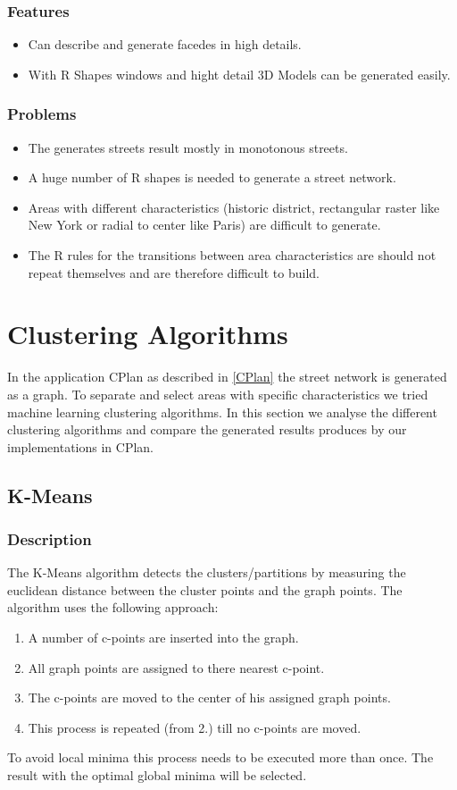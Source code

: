 \documentclass[11pt, a4paper]{report}
\begin{document}
\subsubsection{Features}
\begin{itemize}
    \item Can describe and generate facedes in high details.
    \item With R Shapes windows and hight detail 3D Models can be generated easily.
\end{itemize}

\subsubsection{Problems}
\begin{itemize}
    \item The generates streets result mostly in monotonous streets. 
    \item A huge number of R shapes is needed to generate a street network.
    \item Areas with different characteristics (historic district, rectangular raster like New York or radial to center like Paris) are difficult to generate.
    \item The R rules for the transitions between area characteristics are should not repeat themselves and are therefore difficult to build.
\end{itemize}

\pagebreak
\section{Clustering Algorithms}
In the application CPlan as described in \ref{CPlan} the street network is generated as a graph. To separate and select areas with specific characteristics we tried machine learning clustering algorithms. In this section we analyse the different clustering algorithms and compare the generated results produces by our implementations in CPlan.
\subsection{K-Means}
\subsubsection{Description}
The K-Means algorithm detects the clusters/partitions by measuring the euclidean distance between the cluster points and the graph points. The algorithm uses the following approach: 
\begin{enumerate}
    \item A number of c-points are inserted into the graph.
    \item All graph points are assigned to there nearest c-point.
    \item The c-points are moved to the center of his assigned graph points.
    \item This process is repeated (from 2.) till no c-points are moved.
\end{enumerate}
To avoid local minima this process needs to be executed more than once. The result with the optimal global minima will be selected.
\end{document}
